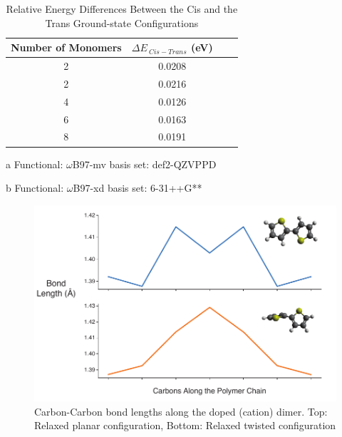 \clearpage
\begin{table}[hbt!]\centering
\captionsetup{justification=centering}
\captionsetup{width=.6\textwidth}
\captionsetup{skip=2pt}
\caption{Relative Energy Differences Between the Cis and the Trans Ground-state Configurations}
\renewcommand{\arraystretch}{1.5}
\begin{threeparttable}
\begin{tabular}{cccc}\toprule
  {Number of Monomers} & {$\Delta E_{ \ Cis - Trans}$ (eV)} \\ \midrule
    2 & 0.0208\tnote{a}\\
    2 & 0.0216\tnote{b}\\
    4 & 0.0126\tnote{b}\\
    6 & 0.0163\tnote{b}\\
    8 & 0.0191\tnote{b}\\ \bottomrule
\end{tabular}
\begin{tablenotes}
\item[a] \footnotesize Functional: $\omega$B97-mv basis set: def2-QZVPPD
\item[b] \footnotesize Functional: $\omega$B97-xd basis set: 6-31++G**
\end{tablenotes}
\end{threeparttable}
\end{table}

\begin{figure}[hbt!]
    \centering
    \includegraphics{figures/append_tor_model/n2_fig_w.pdf}
    \caption[Polaron Localization in PT Chain (N = 2)]{Carbon-Carbon bond lengths along the doped (cation) dimer. Top: Relaxed planar configuration, Bottom: Relaxed twisted configuration}
    \label{fig:n2_bl}
\end{figure}


